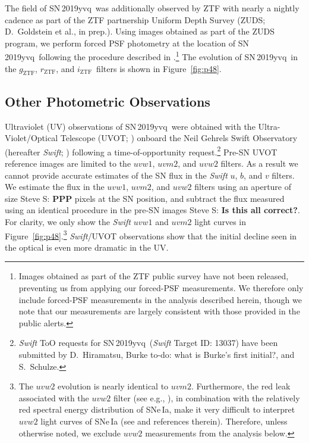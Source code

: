 \documentclass[twocolumn]{aastex63}
\newcommand{\steve}[1]{{\color{DarkCyan} Steve S: \textbf{#1}}}
\newcommand{\todo}[1]{{\color{magenta} to-do: {#1}}}
\newcommand{\rztf}{$r_\mathrm{ZTF}$}
\newcommand{\gztf}{$g_\mathrm{ZTF}$}
\newcommand{\iztf}{$i_\mathrm{ZTF}$}
\newcommand{\sn}{SN\,2019yvq}
\begin{document}
The field of \sn\ was additionally observed by ZTF with nearly a nightly
cadence as part of the ZTF partnership Uniform Depth Survey (ZUDS;
D.~Goldstein et al., in prep.). Using images obtained as part of the ZUDS
program, we perform forced PSF photometry at the location of \sn\ following
the procedure described in \citet{Yao19}.\footnote{Images obtained as part of
the ZTF public survey have not been released, preventing us from applying our
forced-PSF measurements. We therefore only include forced-PSF measurements in
the analysis described herein, though we note that our measurements are
largely consistent with those provided in the public alerts.} The evolution
of \sn\ in the \gztf, \rztf, and \iztf\ filters is shown in
Figure~\ref{fig:p48}.

\subsection{Other Photometric Observations}

Ultraviolet (UV) observations of \sn\ were obtained with the
Ultra-Violet/Optical Telescope (UVOT; \citealt{Roming05}) onboard the Neil
Gehrels Swift Observatory (hereafter \textit{Swift}; \citealt{Gehrels04})
following a time-of-opportunity request.\footnote{\textit{Swift} ToO
requests for \sn\ (\textit{Swift} Target ID: 13037) have been submitted by
D.~Hiramatsu, Burke \todo{what is Burke's first initial?}, and S.~Schulze.}
Pre-SN UVOT reference images are limited to the $uvw1$, $uvm2$, and $uvw2$
filters. As a result we cannot provide accurate estimates of the SN flux in
the \textit{Swift} $u$, $b$, and $v$ filters. We estimate the flux in the
$uvw1$, $uvm2$, and $uvw2$ filters using an aperture of size \steve{PPP}
pixels at the SN position, and subtract the flux measured using an identical
procedure in the pre-SN images \steve{Is this all correct?}. For clarity, we
only show the \textit{Swift} $uvw1$ and $uvm2$ light curves in
Figure~\ref{fig:p48}.\footnote{The $uvw2$ evolution is nearly identical to
$uvm2$. Furthermore, the red leak associated with the $uvw2$ filter (see
e.g., \citealt{Breeveld11}), in combination with the relatively red spectral
energy distribution of SNe\,Ia, make it very difficult to interpret $uvw2$
light curves of SNe\,Ia (see \citealt{Brown17} and references therein).
Therefore, unless otherwise noted, we exclude $uvw2$ measurements from the
analysis below.} \textit{Swift}/UVOT observations show that the initial
decline seen in the optical is even more dramatic in the UV.
\end{document}
